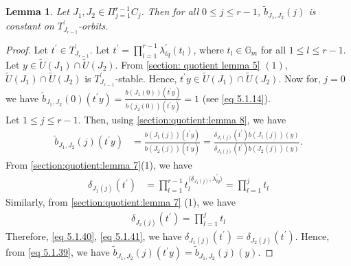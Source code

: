 \documentclass[10pt,a4paper]{amsart}
\newtheorem{lemma}{Lemma}
\begin{document}
	\begin{lemma}\label{section:quotient:lemma 9}
		Let $J_{1},J_{2}\in\Pi_{j=1}^{r-1}C_{j}$. Then for all $0\leq j\leq r-1$, $\tilde{b}_{J_{1},J_{2}}(j)$ is constant on $T^{\prime}_{J_{r-1}}$-orbits.
	\end{lemma}

	\begin{proof}
		Let $t^{\prime}\in T^{\prime}_{J_{r-1}}$. Let $t^{\prime}=\prod_{l=1}^{r-1}\lambda^{\prime}_{lq}(t_{l})$, where $t_{l}\in \mathbb{G}_{m}$ for all $1\leq l\leq r-1$. Let $y\in \tilde{U}(J_{1})\cap \tilde{U}(J_{2})$. From \cref{section: quotient lemma 5} $(1)$, $\tilde{U}(J_{1})\cap \tilde{U}(J_{2})$ is $T^{\prime}_{J_{r-1}}$-stable. Hence, $t^{\prime}y\in \tilde{U}(J_{1})\cap \tilde{U}(J_{2})$. Now for, $j=0$ we have $\tilde{b}_{J_{1},J_{2}}(0)(t^{\prime}y)=\frac{b(J_{1}(0))(t^{\prime}y)}{b(j_{2}(0))(t^{\prime}y)}=1$ (see \cref{eq 5.1.14}).\\
		Let $1\leq j\leq r-1$. Then, using \cref{section:quotient:lemma 8}, we have
		\begin{align}
			\tilde{b}_{J_{1},J_{2}}(j)(t^{\prime}y)&=\frac{b(J_{1}(j))(t^{\prime}y)}{b(J_{2}(j))(t^{\prime}y)}
			=\frac{\delta_{J_{1}(j)}(t^{\prime})b(J_{1}(j))(y)}{\delta_{J_{2}(j)}(t^{\prime})b(J_{2}(j))(y)}.\label{eq 5.1.39}
		\end{align}
	From \cref{section:quotient:lemma 7}(1), we have  \begin{align}
		\delta_{J_{1}(j)}(t^{\prime})&=\prod_{l=1}^{r-1}t_{l}^{\langle\delta_{J_{1}(j)},\lambda^{\prime}_{lq}\rangle}
		=\prod_{l=1}^{j}t_{l}\label{eq 5.1.40}
	\end{align}
Similarly, from \cref{section:quotient:lemma 7} (1), we have
\begin{align}
	\delta_{J_{2}(j)}(t^{\prime})=\prod_{l=1}^{j}t_{l}\label{eq 5.1.41}
\end{align}
		Therefore, \cref{eq 5.1.40}, \cref{eq 5.1.41}, we have $\delta_{J_{1}(j)}(t^{\prime})=\delta_{J_{2}(j)}(t^{\prime})$. Hence, 
		from \cref{eq 5.1.39}, we have 	$\tilde{b}_{J_{1},J_{2}}(j)(t^{\prime}y)=\tilde{b}_{J_{1},J_{2}}(j)(y)$.
	\end{proof}
\end{document}
